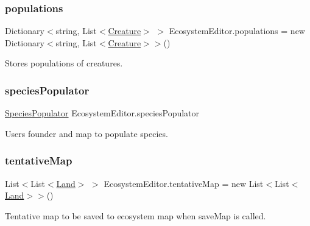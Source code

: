 \subsubsection{\texorpdfstring{populations}{populations}}
{\footnotesize\ttfamily Dictionary$<$string, List$<$\mbox{\hyperlink{class_creature}{Creature}}$>$ $>$ Ecosystem\+Editor.\+populations = new Dictionary$<$string, List$<$\mbox{\hyperlink{class_creature}{Creature}}$>$$>$()}



Stores populations of creatures. 

\mbox{\label{class_ecosystem_editor_abe484ddd93b48d1300e88ab531d56aec}} 
\subsubsection{\texorpdfstring{species\+Populator}{speciesPopulator}}
{\footnotesize\ttfamily \mbox{\hyperlink{class_species_populator}{Species\+Populator}} Ecosystem\+Editor.\+species\+Populator}



Users founder and map to populate species. 

\mbox{\label{class_ecosystem_editor_a40077803f584d6c42951feac3569a972}} 
\subsubsection{\texorpdfstring{tentative\+Map}{tentativeMap}}
{\footnotesize\ttfamily List$<$List$<$\mbox{\hyperlink{class_land}{Land}}$>$ $>$ Ecosystem\+Editor.\+tentative\+Map = new List$<$List$<$\mbox{\hyperlink{class_land}{Land}}$>$$>$()}



Tentative map to be saved to ecosystem map when save\+Map is called. 

\mbox{\label{class_ecosystem_editor_aa0e6ad8b42512f087178aca21464da02}} 
